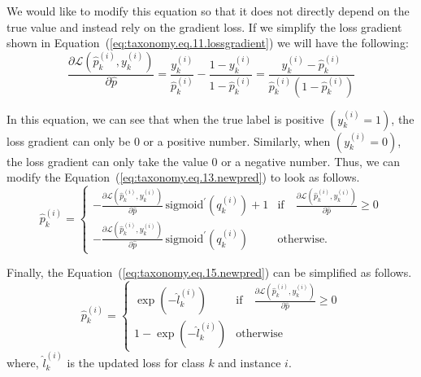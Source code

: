 We would like to modify this equation so that it does not directly depend on the true value and instead rely on the gradient loss. If we simplify the loss gradient shown in Equation~(\ref{eq:taxonomy.eq.11.lossgradient})  we will have the following:
\begin{equation}
    \label{eq:taxonomy.eq.14.newlossgradient}
    \frac{\partial \mathcal{L}(\widehat{p}_k^{(i)}, y_k^{(i)})}{\partial \widehat{p}} = \frac{y_k^{(i)}}{\widehat{p}_k^{(i)}} - \frac{1 - y_k^{(i)}}{1 - \widehat{p}_k^{(i)}} = \frac{y_k^{(i)} - \widehat{p}_k^{(i)}}{\widehat{p}_k^{(i)}(1 - \widehat{p}_k^{(i)})}
\end{equation}

In this equation, we can see that when the true label is positive $\left(y_k^{(i)}=1\right) $, the loss gradient can only be 0 or a positive number. Similarly, when $\left(y_k^{(i)}=0\right) $, the loss gradient can only take the value 0 or a negative number. Thus, we can modify the Equation~(\ref{eq:taxonomy.eq.13.newpred})  to look as follows.
\begin{equation}
    \label{eq:taxonomy.eq.15.newpred}
    \widehat{p}_k^{(i)} =
    \begin{cases}
        -\frac{\partial \mathcal{L}(\widehat{p}_k^{(i)}, y_k^{(i)})}{\partial \widehat{p}} \, \text{sigmoid}^{\prime}(q_k^{(i)}) + 1 & \text{if} \quad \frac{\partial \mathcal{L}(\widehat{p}_k^{(i)}, y_k^{(i)})}{\partial \widehat{p}} \geq 0 \\
        -\frac{\partial \mathcal{L}(\widehat{p}_k^{(i)}, y_k^{(i)})}{\partial \widehat{p}} \, \text{sigmoid}^{\prime}(q_k^{(i)}) & \text{otherwise.}
    \end{cases}
\end{equation}

Finally, the Equation~(\ref{eq:taxonomy.eq.15.newpred}) can be simplified as follows.
\begin{equation}
    \label{eq:taxonomy.eq.16.newpred}
    \widehat{p}_k^{(i)} =
    \begin{cases}
        \exp(-\widehat{l}_k^{(i)}) & \text{if} \quad \frac{\partial \mathcal{L}(\widehat{p}_k^{(i)}, y_k^{(i)})}{\partial \widehat{p}} \geq 0 \\
        1 - \exp(-\widehat{l}_k^{(i)}) & \text{otherwise}
    \end{cases}
\end{equation}
where, ${\widehat l}_k^{(i)} $ is the updated loss for class $k $ and instance $i $.

